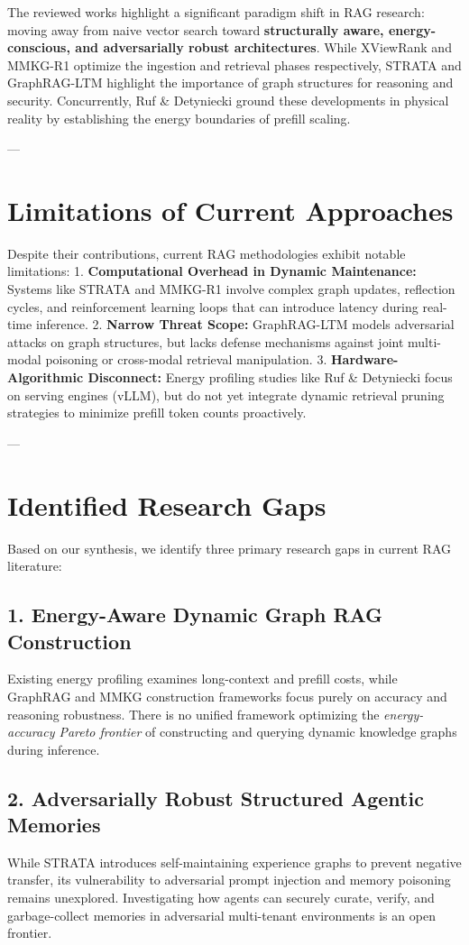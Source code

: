 \documentclass[11pt,a4paper]{article}
\begin{document}
The reviewed works highlight a significant paradigm shift in RAG research: moving away from naive vector search toward \textbf{structurally aware, energy-conscious, and adversarially robust architectures}. While XViewRank and MMKG-R1 optimize the ingestion and retrieval phases respectively, STRATA and GraphRAG-LTM highlight the importance of graph structures for reasoning and security. Concurrently, Ruf \& Detyniecki ground these developments in physical reality by establishing the energy boundaries of prefill scaling.

---

\section{Limitations of Current Approaches}
Despite their contributions, current RAG methodologies exhibit notable limitations:
1. \textbf{Computational Overhead in Dynamic Maintenance:} Systems like STRATA and MMKG-R1 involve complex graph updates, reflection cycles, and reinforcement learning loops that can introduce latency during real-time inference.
2. \textbf{Narrow Threat Scope:} GraphRAG-LTM models adversarial attacks on graph structures, but lacks defense mechanisms against joint multi-modal poisoning or cross-modal retrieval manipulation.
3. \textbf{Hardware-Algorithmic Disconnect:} Energy profiling studies like Ruf \& Detyniecki focus on serving engines (vLLM), but do not yet integrate dynamic retrieval pruning strategies to minimize prefill token counts proactively.

---

\section{Identified Research Gaps}
Based on our synthesis, we identify three primary research gaps in current RAG literature:

\subsection{1. Energy-Aware Dynamic Graph RAG Construction}
Existing energy profiling examines long-context and prefill costs, while GraphRAG and MMKG construction frameworks focus purely on accuracy and reasoning robustness. There is no unified framework optimizing the \textit{energy-accuracy Pareto frontier} of constructing and querying dynamic knowledge graphs during inference.

\subsection{2. Adversarially Robust Structured Agentic Memories}
While STRATA introduces self-maintaining experience graphs to prevent negative transfer, its vulnerability to adversarial prompt injection and memory poisoning remains unexplored. Investigating how agents can securely curate, verify, and garbage-collect memories in adversarial multi-tenant environments is an open frontier.
\end{document}
